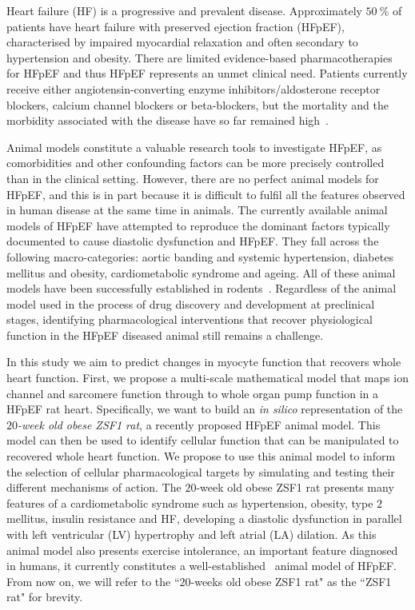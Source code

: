 \vspace{0.2cm}\noindent
{}

\noindent
Heart failure (HF) is a progressive and prevalent disease. Approximately $\SI{50}{\percent}$ of patients have heart failure with preserved ejection fraction (HFpEF), characterised by impaired myocardial relaxation and often secondary to hypertension and obesity. There are limited evidence-based pharmacotherapies for HFpEF and thus HFpEF represents an unmet clinical need. Patients currently receive either angiotensin-converting enzyme inhibitors/aldosterone receptor blockers, calcium channel blockers or beta-blockers, but the mortality and the morbidity associated with the disease have so far remained high~\cite{Adamczak:2020}.

Animal models constitute a valuable research tools to investigate HFpEF, as comorbidities and other confounding factors can be more precisely controlled than in the clinical setting. However, there are no perfect animal models for HFpEF, and this is in part because it is difficult to fulfil all the features observed in human disease at the same time in animals. The currently available animal models of HFpEF have attempted to reproduce the dominant factors typically documented to cause diastolic dysfunction and HFpEF. They fall across the following macro-categories: aortic banding and systemic hypertension, diabetes mellitus and obesity, cardiometabolic syndrome and ageing. All of these animal models have been successfully established in rodents~\cite{Conceicao:2016}. Regardless of the animal model used in the process of drug discovery and development at preclinical stages, identifying pharmacological interventions that recover physiological function in the HFpEF diseased animal still remains a challenge.

In this study we aim to predict changes in myocyte function that recovers whole heart function. First, we propose a multi-scale mathematical model that maps ion channel and sarcomere function through to whole organ pump function in a HFpEF rat heart. Specifically, we want to build an \textit{in silico} representation of the \textit{$20$-week old obese ZSF1 rat}, a recently proposed HFpEF animal model. This model can then be used to identify cellular function that can be manipulated to recovered whole heart function. We propose to use this animal model to inform the selection of cellular pharmacological targets by simulating and testing their different mechanisms of action. The $20$-week old obese ZSF1 rat presents many features of a cardiometabolic syndrome such as hypertension, obesity, type $2$ mellitus, insulin resistance and HF, developing a diastolic dysfunction in parallel with left ventricular (LV) hypertrophy and left atrial (LA) dilation. As this animal model also presents exercise intolerance, an important feature diagnosed in humans, it currently constitutes a well-established~\cite{Conceicao:2016} animal model of HFpEF. From now on, we will refer to the ``$20$-weeks old obese ZSF1 rat" as the ``ZSF1 rat" for brevity.


